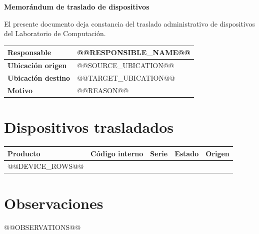 \documentclass[letterpaper,12pt]{article}
\begin{document}
\begin{center}
    \LARGE\textbf{Memorándum de traslado de dispositivos}
\end{center}

\vspace{0.3cm}

El presente documento deja constancia del traslado administrativo de dispositivos del Laboratorio de Computación.

\vspace{0.4cm}

\begin{tabular}{|p{}|p{}|}
    \hline
    \textbf{Responsable} & @@RESPONSIBLE_NAME@@ \\ \hline
    \textbf{Ubicación origen} & @@SOURCE_UBICATION@@ \\ \hline
    \textbf{Ubicación destino} & @@TARGET_UBICATION@@ \\ \hline
    \textbf{Motivo} & @@REASON@@ \\ \hline
\end{tabular}

\vspace{0.5cm}

\section*{Dispositivos trasladados}

\begin{longtable}{|p{}|p{}|p{}|p{}|p{}|}
    \hline
    \rowcolor[HTML]{cccccc}
    \textbf{Producto} &
    \textbf{Código interno} &
    \textbf{Serie} &
    \textbf{Estado} &
    \textbf{Origen} \\
    \hline
    @@DEVICE_ROWS@@
\end{longtable}

\vspace{0.2cm}

\section*{Observaciones}
@@OBSERVATIONS@@
\end{document}
